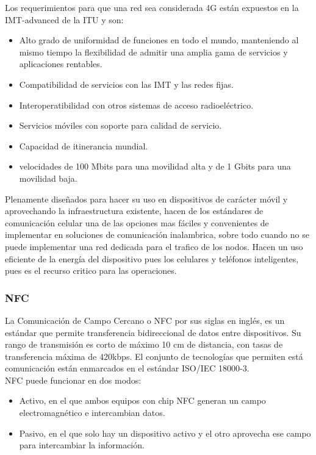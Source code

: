 Los requerimientos para que una red sea considerada 4G  están expuestos en la IMT-advanced de la ITU y son:
\begin{itemize}
\item Alto grado de uniformidad de funciones en todo el mundo, manteniendo al mismo tiempo la flexibilidad de admitir una amplia gama de servicios y aplicaciones rentables.
\item Compatibilidad de servicios con las IMT y las redes fijas.
\item Interoperatibilidad con otros sistemas de acceso radioeléctrico.
\item Servicios móviles con soporte para calidad de servicio.
\item Capacidad de itinerancia mundial.
\item velocidades de 100 Mbits para una movilidad alta y de 1 Gbits para una movilidad baja.
\end{itemize}

Plenamente diseñados para hacer su uso en dispositivos de carácter móvil y aprovechando la infraestructura existente, hacen de los estándares de comunicación celular una de las opciones mas fáciles y convenientes de implementar en soluciones de comunicación inalambrica, sobre todo cuando no se puede implementar una red dedicada para el trafico de los nodos. Hacen un uso eficiente de la energía del dispositivo pues los celulares y teléfonos inteligentes, pues es el recurso critico para las operaciones.

\subsubsection{NFC}
La Comunicación de Campo Cercano o NFC  por sus siglas en inglés, es un estándar que permite transferencia bidireccional de datos entre dispositivos. Su rango de transmisión es corto de máximo 10 cm de distancia, con tasas de transferencia máxima de 420kbps. El conjunto de tecnologías que permiten está comunicación están enmarcados en el estándar ISO/IEC 18000-3.\cite{isonfc}\\

NFC puede funcionar en dos modos:
\begin{itemize}
\item Activo, en el que ambos equipos con chip NFC generan un campo electromagnético e intercambian datos.
\item Pasivo, en el que solo hay un dispositivo activo y el otro aprovecha ese campo para intercambiar la información.
\end{itemize}

